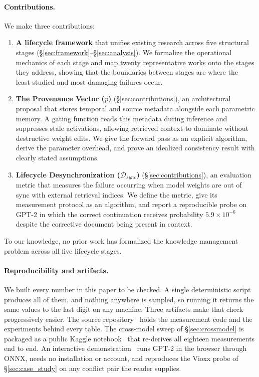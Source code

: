 \documentclass[manuscript, screen, review]{jair}
\begin{document}
\paragraph{Contributions.} We make three contributions:

\begin{enumerate}[leftmargin=*]
  \item \textbf{A lifecycle framework} that unifies existing research across five structural stages (\S\ref{sec:framework}--\S\ref{sec:analysis}). We formalize the operational mechanics of each stage and map twenty representative works onto the stages they address, showing that the boundaries between stages are where the least-studied and most damaging failures occur.

  \item \textbf{The Provenance Vector ($p$)} (\S\ref{sec:contributions}), an architectural proposal that stores temporal and source metadata alongside each parametric memory. A gating function reads this metadata during inference and suppresses stale activations, allowing retrieved context to dominate without destructive weight edits. We give the forward pass as an explicit algorithm, derive the parameter overhead, and prove an idealized consistency result with clearly stated assumptions.

  \item \textbf{Lifecycle Desynchronization ($\mathcal{D}_{sync}$)} (\S\ref{sec:contributions}), an evaluation metric that measures the failure occurring when model weights are out of sync with external retrieval indices. We define the metric, give its measurement protocol as an algorithm, and report a reproducible probe on GPT-2 in which the correct continuation receives probability $5.9 \times 10^{-6}$ despite the corrective document being present in context.
\end{enumerate}

To our knowledge, no prior work has formalized the knowledge management problem across all five lifecycle stages.

\paragraph{Reproducibility and artifacts.} We built every number in this paper to be checked. A single deterministic script produces all of them, and nothing anywhere is sampled, so running it returns the same values to the last digit on any machine. Three artifacts make that check progressively easier. The source repository~\citep{thakur2026code} holds the measurement code and the experiments behind every table. The cross-model sweep of \S\ref{sec:crossmodel} is packaged as a public Kaggle notebook~\citep{thakur2026notebook} that re-derives all eighteen measurements end to end. An interactive demonstration~\citep{thakur2026demo} runs GPT-2 in the browser through ONNX, needs no installation or account, and reproduces the Vioxx probe of \S\ref{sec:case_study} on any conflict pair the reader supplies.
\end{document}
